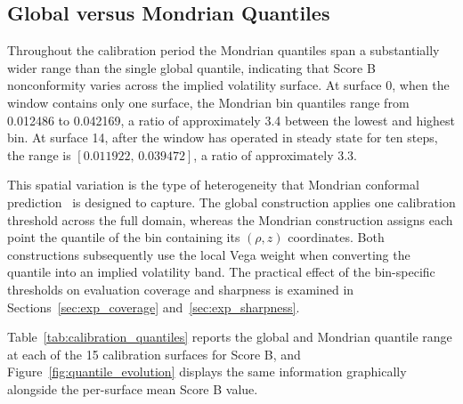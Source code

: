 \subsection{Global versus Mondrian Quantiles}
\label{subsec:exp_global_mondrian}

Throughout the calibration period the Mondrian quantiles span a substantially wider range than the single global quantile, indicating that Score B nonconformity varies across the implied volatility surface. At surface 0, when the window contains only one surface, the Mondrian bin quantiles range from 0.012486 to 0.042169, a ratio of approximately 3.4 between the lowest and highest bin. At surface 14, after the window has operated in steady state for ten steps, the range is $[0.011922,\,0.039472]$, a ratio of approximately 3.3.

This spatial variation is the type of heterogeneity that Mondrian conformal prediction~\cite{shafer2008tutorial,angelopoulos2023gentle} is designed to capture. The global construction applies one calibration threshold across the full domain, whereas the Mondrian construction assigns each point the quantile of the bin containing its $(\rho,z)$ coordinates. Both constructions subsequently use the local Vega weight when converting the quantile into an implied volatility band. The practical effect of the bin-specific thresholds on evaluation coverage and sharpness is examined in Sections~\ref{sec:exp_coverage} and~\ref{sec:exp_sharpness}.

Table~\ref{tab:calibration_quantiles} reports the global and Mondrian quantile range at each of the 15 calibration surfaces for Score B, and Figure~\ref{fig:quantile_evolution} displays the same information graphically alongside the per-surface mean Score B value.

